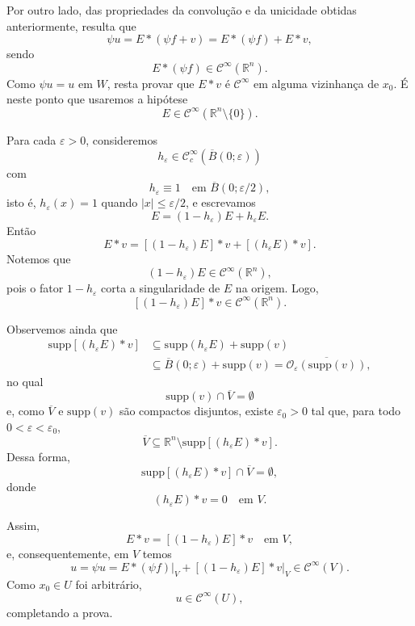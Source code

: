 \documentclass[../distribution_theory_notes.tex]{subfiles}
\begin{document}
\begin{proof*}
	Por outro lado, das propriedades da convolução e da unicidade obtidas anteriormente, resulta que
	\[
		\psi u
		=E*(\psi f+v)
		=E*(\psi f)+E*v,
	\]
	sendo
	\[
		E*(\psi f)\in\mathcal{C}^{\infty}(\mathbb{R}^{n}).
	\]
	Como \(\psi u=u\) em \(W\), resta provar que \(E*v\) é \(\mathcal{C}^{\infty}\) em alguma vizinhança de \(x_{0}\). É neste ponto que usaremos a hipótese
	\[
		E\in\mathcal{C}^{\infty}(\mathbb{R}^{n}\setminus\{0\}).
	\]

	Para cada \(\varepsilon>0\), consideremos
	\[
		h_{\varepsilon}\in\mathcal{C}_{c}^{\infty}(\overline{B}(0;\varepsilon))
	\]
	com
	\[
		h_{\varepsilon}\equiv1
		\quad\text{em }\overline{B}(0;\varepsilon/2),
	\]	isto é, \(h_{\varepsilon}(x)=1\) quando \(|x|\leq\varepsilon/2\), e escrevamos
	\[
		E=(1-h_{\varepsilon})E+h_{\varepsilon}E.
	\]
	Então
	\[
		E*v=[(1-h_{\varepsilon})E]*v+[(h_{\varepsilon}E)*v].
	\]
	Notemos que
	\[
		(1-h_{\varepsilon})E\in\mathcal{C}^{\infty}(\mathbb{R}^{n}),
	\]
	pois o fator \(1-h_{\varepsilon}\) corta a singularidade de \(E\) na origem. Logo,
	\[
		[(1-h_{\varepsilon})E]*v\in\mathcal{C}^{\infty}(\mathbb{R}^{n}).
	\]

	Observemos ainda que
	\begin{align*}
		\mathrm{supp}[(h_{\varepsilon}E)*v]
		 & \subseteq \mathrm{supp}(h_{\varepsilon}E)+\mathrm{supp}(v) \\
		 & \subseteq \overline{B}(0;\varepsilon)+\mathrm{supp}(v)
		=\overline{\mathcal{O}_{\varepsilon}(\mathrm{supp}(v))},
	\end{align*}
	no qual
	\[
		\mathrm{supp}(v)\cap\overline{V}=\emptyset
	\]
	e, como \(\overline{V}\) e \(\mathrm{supp}(v)\) são compactos disjuntos, existe \(\varepsilon_{0}>0\) tal que, para todo \(0<\varepsilon<\varepsilon_{0}\),
	\[
		\overline{V}\subseteq
		\mathbb{R}^{n}\setminus\mathrm{supp}[(h_{\varepsilon}E)*v].
	\]
	Dessa forma,
	\[
		\mathrm{supp}[(h_{\varepsilon}E)*v]\cap\overline{V}=\emptyset,
	\]
	donde
	\[
		(h_{\varepsilon}E)*v=0
		\quad\text{em }V.
	\]

	Assim,
	\[
		E*v=[(1-h_{\varepsilon})E]*v
		\quad\text{em }V,
	\]
	e, consequentemente, em \(V\) temos
	\[
		u=\psi u
		=\left.E*(\psi f)\right|_{V}
		+\left.[(1-h_{\varepsilon})E]*v\right|_{V}
		\in\mathcal{C}^{\infty}(V).
	\]
	Como \(x_{0}\in U\) foi arbitrário,
	\[
		u\in\mathcal{C}^{\infty}(U),
	\]
	completando a prova. \qedsymbol
\end{proof*}
\end{document}
